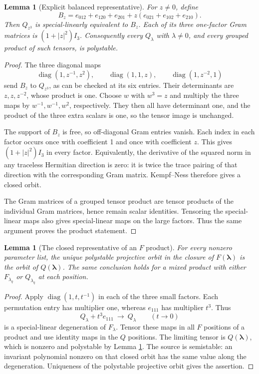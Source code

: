 \documentclass[11pt]{article}
\newtheorem{lemma}[theorem]{Lemma}
\theoremstyle{remark}\newtheorem{remark}[theorem]{Remark}
\newcommand{\diag}{\operatorname{diag}}
\begin{document}
\begin{lemma}[Explicit balanced representative]\label{lem:balanced}
For $z\ne0$, define
\[
 B_z=e_{012}+e_{120}+e_{201}+z(e_{021}+e_{102}+e_{210}).
\]
Then $Q_{z^3}$ is special-linearly equivalent to $B_z$. Each of its three one-factor Gram matrices is $(1+|z|^2)I_3$. Consequently every $Q_\lambda$ with $\lambda\ne0$, and every grouped product of such tensors, is polystable.
\end{lemma}
\begin{proof}
The three diagonal maps
\begin{equation}\label{eq:balancedmap}
 \diag(1,z^{-1},z^2),\qquad
 \diag(1,1,z),\qquad
 \diag(1,z^{-2},1)
\end{equation}
send $B_z$ to $Q_{z^3}$, as can be checked at its six entries. Their determinants are $z,z,z^{-2}$, whose product is one. Choose $w$ with $w^3=z$ and multiply the three maps by $w^{-1},w^{-1},w^2$, respectively. They then all have determinant one, and the product of the three extra scalars is one, so the tensor image is unchanged.

The support of $B_z$ is free, so off-diagonal Gram entries vanish. Each index in each factor occurs once with coefficient 1 and once with coefficient $z$. This gives $(1+|z|^2)I_3$ in every factor. Equivalently, the derivative of the squared norm in any traceless Hermitian direction is zero: it is twice the trace pairing of that direction with the corresponding Gram matrix. Kempf--Ness therefore gives a closed orbit.

The Gram matrices of a grouped tensor product are tensor products of the individual Gram matrices, hence remain scalar identities. Tensoring the special-linear maps also gives special-linear maps on the large factors. Thus the same argument proves the product statement.
\end{proof}

\begin{lemma}[The closed representative of an $F$ product]\label{lem:FQ}
For every nonzero parameter list, the unique polystable projective orbit in the closure of $F(\boldsymbol\lambda)$ is the orbit of $Q(\boldsymbol\lambda)$. The same conclusion holds for a mixed product with either $F_{\lambda_q}$ or $Q_{\lambda_q}$ at each position.
\end{lemma}
\begin{proof}
Apply $\diag(1,t,t^{-1})$ in each of the three small factors. Each permutation entry has multiplier one, whereas $e_{111}$ has multiplier $t^3$. Thus
\begin{equation}\label{eq:FQlimit}
 Q_\lambda+t^3e_{111}\ \longrightarrow\ Q_\lambda
 \qquad(t\to0)
\end{equation}
is a special-linear degeneration of $F_\lambda$. Tensor these maps in all $F$ positions of a product and use identity maps in the $Q$ positions. The limiting tensor is $Q(\boldsymbol\lambda)$, which is nonzero and polystable by Lemma \ref{lem:balanced}. The source is semistable: an invariant polynomial nonzero on that closed orbit has the same value along the degeneration. Uniqueness of the polystable projective orbit gives the assertion.
\end{proof}
\end{document}
